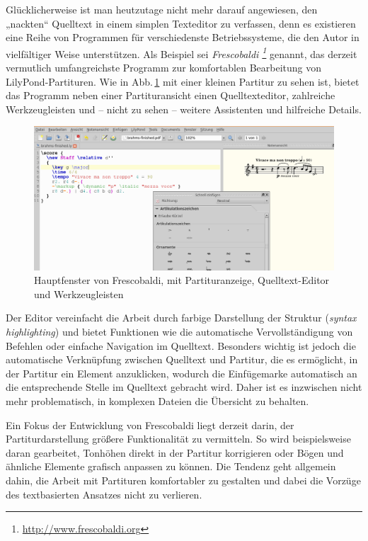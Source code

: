 \documentclass[DIV=12]{scrreprt}
\begin{document}
\bigskip
Glücklicherweise ist man heutzutage nicht mehr darauf angewiesen, den „nackten“ Quelltext in einem simplen Texteditor zu verfassen, denn es existieren eine Reihe von Programmen für verschiedenste Betriebssysteme, die den Autor in vielfältiger Weise unterstützen.
Als Beispiel sei \textit{Frescobaldi%
\footnote{\url{http://www.frescobaldi.org}}}
genannt, das derzeit vermutlich umfangreichste Programm zur komfortablen Bearbeitung von LilyPond-Partituren.
Wie in Abb.\,\ref{fig:pt_fb-main-window} mit einer kleinen Partitur zu sehen ist, bietet das Programm neben einer Partituransicht einen Quelltexteditor, zahlreiche Werkzeugleisten und -- nicht zu sehen -- weitere Assistenten und hilfreiche Details.
	\begin{figure}
	\includegraphics[max width=\textwidth]{examples/frescobaldi-main}
	\caption{Hauptfenster von Frescobaldi, mit Partituranzeige, Quelltext-Editor und Werkzeugleisten}
	\label{fig:pt_fb-main-window}
	\end{figure}
Der Editor vereinfacht die Arbeit durch farbige Darstellung der Struktur (\emph{syntax highlighting}) und bietet Funktionen wie die automatische Vervollständigung von Befehlen oder einfache Navigation im Quelltext.
Besonders wichtig ist jedoch die automatische Verknüpfung zwischen Quelltext und Partitur, die es ermöglicht, in der Partitur ein Element anzuklicken, wodurch die Einfügemarke automatisch an die entsprechende Stelle im Quelltext gebracht wird.
Daher ist es inzwischen nicht mehr problematisch, in komplexen Dateien die Übersicht zu behalten.

Ein Fokus der Entwicklung von Frescobaldi liegt derzeit darin, der Partiturdarstellung größere Funktionalität zu vermitteln.
So wird beispielsweise daran gearbeitet, Tonhöhen direkt in der Partitur  korrigieren oder Bögen und ähnliche Elemente grafisch anpassen zu können.
Die Tendenz geht allgemein dahin, die Arbeit mit Partituren komfortabler zu gestalten und dabei die Vorzüge des textbasierten Ansatzes nicht zu verlieren.
\end{document}
